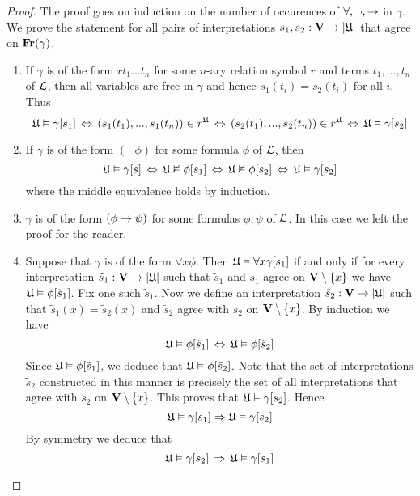 \begin{proof}
The proof goes on induction on the number of occurences of $\forall, \neg, \rightarrow$ in $\gamma$. We prove the
statement for all pairs of interpretations $s_1,s_2: \mathbf{V} \rightarrow |{\mathfrak U}|$ that agree on $\mathbf{Fr}(\gamma)$.
\begin{enumerate}[label=\textbf{(\arabic*)}, leftmargin=3.0em]
\item If $\gamma$ is of the form $rt_1 ...t_n$ for some $n$-ary relation symbol $r$ and terms $t_1,...,t_n$ of ${\mathcal L}$, then all variables are free in $\gamma$ and hence $s_1(t_i) = s_2(t_i)$ for all $i$. Thus
$${\mathfrak U} \vDash \gamma[s_1] \,\Leftrightarrow\, \left(s_1(t_1), ...,s_1(t_n)\right) \in r^{\mathfrak U} \,\Leftrightarrow\, \left(s_2(t_1),...,s_2(t_n)\right) \in r^{\mathfrak U} \,\Leftrightarrow\, {\mathfrak U} \vDash \gamma[s_2]$$
\item If $\gamma$ is of the form $(\neg \phi)$ for some formula $\phi$ of ${\mathcal L}$, then
$${\mathfrak U} \vDash \gamma[s] \,\Leftrightarrow\, {\mathfrak U} \nvDash \phi[s_1] \,\Leftrightarrow\, {\mathfrak U} \nvDash \phi[s_2] \,\Leftrightarrow\, {\mathfrak U} \vDash \gamma[s_2]$$
where the middle equivalence holds by induction.
\item $\gamma$ is of the form $(\phi \rightarrow \psi)$ for some formulas $\phi, \psi$ of ${\mathcal L}$. In this case we left the proof for the
reader.
\item Suppose that $\gamma$ is of the form $\forall x \phi$. Then ${\mathfrak U} \vDash \forall x \gamma[s_1]$ if and only if for every interpretation $\tilde{s}_1:\mathbf{V} \rightarrow |{\mathfrak U}|$ such that $\tilde{s}_1$ and $s_1$ agree on $\mathbf{V} \setminus\{x\}$ we have ${\mathfrak U} \vDash \phi[\tilde{s}_1]$. Fix one such $\tilde{s}_1$. Now we define an interpretation $\tilde{s}_2:\mathbf{V} \rightarrow |{\mathfrak U}|$ such that $\tilde{s}_1(x) = \tilde{s}_2(x)$ and $\tilde{s}_2$ agree with $s_2$ on $\mathbf{V} \setminus \{x\}$. By induction we have
$${\mathfrak U} \vDash \phi[\tilde{s}_1] \,\Leftrightarrow\, {\mathfrak U} \vDash \phi[\tilde{s}_2]$$
Since ${\mathfrak U} \vDash \phi[\tilde{s}_1]$, we deduce that ${\mathfrak U} \vDash \phi[\tilde{s}_2]$. Note that the set of interpretations $\tilde{s}_2$ constructed in this manner is precisely the set of all interpretations that agree with $s_2$ on $\mathbf{V} \setminus \{x\}$. This proves that ${\mathfrak U} \vDash \gamma[s_2]$. Hence
$${\mathfrak U} \vDash \gamma[s_1] \Rightarrow {\mathfrak U} \vDash \gamma[s_2]$$
By symmetry we deduce that
$${\mathfrak U} \vDash \gamma[s_2] \,\Rightarrow\, {\mathfrak U} \vDash \gamma[s_1]$$
\end{enumerate}
\end{proof}

